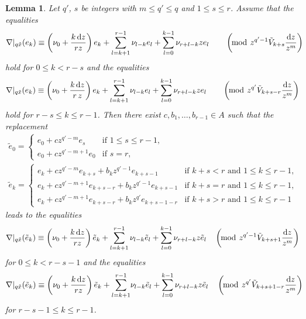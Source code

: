 \documentclass[pdftex]{sigma}
\numberwithin{equation}{section}
\newtheorem{Lemma}[Theorem]{Lemma}
\begin{document}
\begin{Lemma}Let $q'$, $s$ be integers with $m\leq q'\leq q$ and $1\leq s\leq r$.
Assume that the equalities
\begin{gather} \label{equation: assumption of formal equivalence modulo first case}
 \nabla|_{q\tilde{x}}(e_k)
 \equiv
 \left( \nu_0+\frac{k\,{\rm d}z}{r z} \right) e_k
 +\sum_{l=k+1}^{r-1} \nu_{l-k} e_l
 +\sum_{l=0}^{k-1} \nu_{r+l-k} z e_l
 \qquad \left(\! \bmod \ z^{q'-1}\tilde{V}_{k+s}\frac{{\rm d}z}{z^m} \right)\!\!\!
\end{gather}
hold for $0\leq k < r-s$
and
the equalities
\begin{equation} \label{equation: assumption of formal equivalence modulo second case}
 \nabla|_{q\tilde{x}}(e_k)
 \equiv
 \left( \nu_0+\frac{k\,{\rm d}z}{r\,z} \right) e_k
 +\sum_{l=k+1}^{r-1} \nu_{l-k} e_l
 +\sum_{l=0}^{k-1} \nu_{r+l-k} z e_l
 \qquad \left(\! \bmod \ z^{q'}\tilde{V}_{k+s-r}\frac{{\rm d}z}{z^m} \right)
\end{equation}
hold for $r-s\leq k\leq r-1$.
Then there exist $c,b_1,\dots,b_{r-1}\in A$
such that the replacement
\begin{gather}
 \tilde{e}_0
 =
\begin{cases}
 e_0+c z^{q'-m} e_s & \text{if $1\leq s\leq r-1$}, \\
 e_0+c z^{q'-m+1}e_0 & \text{if $s=r$},
 \end{cases}\nonumber
 \\
 \tilde{e}_k
 =
 \begin{cases}
 e_k+c z^{q'-m}e_{k+s}+b_kz^{q'-1}e_{k+s-1}
 & \text{if $k+s <r$ and $1\leq k\leq r-1$},
 \\
 e_k+c z^{q'-m+1} e_{k+s-r}+b_k z^{q'-1}e_{k+s-1}
 & \text{if $k+s= r$ and $1\leq k\leq r-1$},
 \\
 e_k+c z^{q'-m+1} e_{k+s-r}+b_kz^{q'}e_{k+s-1-r}
 & \text{if $k+s>r$ and $1\leq k\leq r-1$}
 \end{cases}\label{equation: replacement in general case}
 \end{gather}
leads to the equalities
\begin{gather} \label{equation: equivalence in the next step case 1}
 \nabla|_{q\tilde{x}}(\tilde{e}_k)
 \equiv
 \left( \nu_0+\frac{k\,{\rm d}z}{r z} \right) \tilde{e}_k
 +\sum_{l=k+1}^{r-1} \nu_{l-k} \tilde{e}_l
 +\sum_{l=0}^{k-1} \nu_{r+l-k} z \tilde{e}_l
 \quad \left(\! \bmod \ z^{q'-1}\tilde{V}_{k+s+1}\frac{{\rm d}z}{z^m} \right)
\end{gather}
for $0\leq k<r-s-1$
and the equalities
\begin{gather} \label{equation: equivalence in the next step case 2}
 \nabla|_{q\tilde{x}}(\tilde{e}_k)
 \equiv
 \left( \nu_0+\frac{k\,{\rm d}z}{r z} \right) \tilde{e}_k
 +\sum_{l=k+1}^{r-1}\! \nu_{l-k} \tilde{e}_l
 +\sum_{l=0}^{k-1} \nu_{r+l-k} z \tilde{e}_l
 \quad \left(\! \bmod \ z^{q'}\tilde{V}_{k+s+1-r}\frac{{\rm d}z}{z^m} \right)\!\!\!
\end{gather}
for $r-s-1\leq k\leq r-1$.
\end{Lemma}
\end{document}
